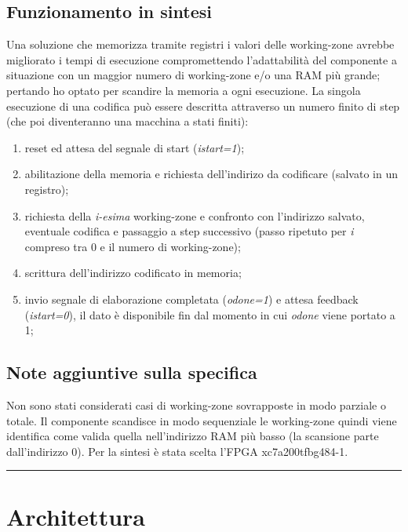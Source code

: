 \documentclass{article}
\begin{document}
\subsection{Funzionamento in sintesi}
Una soluzione che memorizza tramite registri i valori delle working-zone avrebbe migliorato i tempi di esecuzione compromettendo l'adattabilità del componente a situazione con un maggior numero di working-zone e/o una RAM più grande; pertando ho optato per scandire la memoria a ogni esecuzione.
La singola esecuzione di una codifica può essere descritta attraverso un numero finito di step (che poi diventeranno una macchina a stati finiti):
\begin{enumerate}
	\item reset ed attesa del segnale di start (\textit{i\textunderscore start=1});
	\item abilitazione della memoria e richiesta dell'indirizo da codificare (salvato in un registro);
	\item richiesta della \textit{i-esima} working-zone e confronto con l'indirizzo salvato, eventuale codifica e passaggio a step successivo (passo ripetuto per \textit{i} compreso tra 0 e il numero di working-zone);
	\item scrittura dell'indirizzo codificato in memoria;
	\item invio segnale di elaborazione completata (\textit{o\textunderscore done=1}) e attesa feedback (\textit{i\textunderscore start=0}), il dato è disponibile fin dal momento in cui \textit{o\textunderscore done} viene portato a 1;
\end{enumerate}
\subsection{Note aggiuntive sulla specifica}
Non sono stati considerati casi di working-zone sovrapposte in modo parziale o totale. Il componente scandisce in modo sequenziale le working-zone quindi viene identifica come valida quella nell'indirizzo RAM più basso (la scansione parte dall'indirizzo 0).
Per la sintesi è stata scelta l'FPGA xc7a200tfbg484-1.

\noindent\rule{\textwidth}{0.5pt}
\newpage
\section{Architettura}
\end{document}
